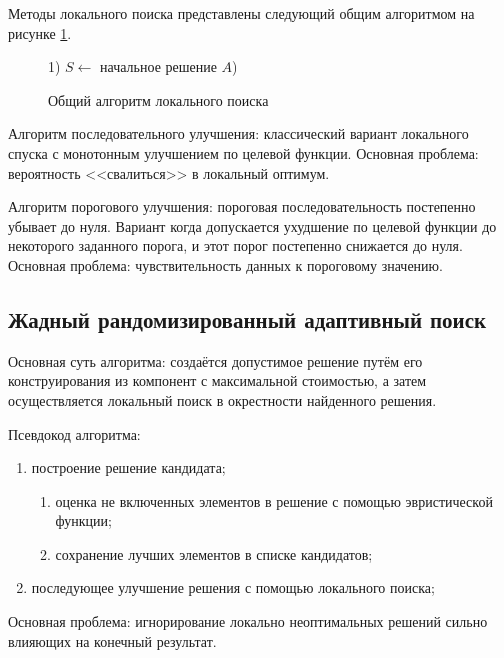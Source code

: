 Методы локального поиска представлены следующий общим алгоритмом на рисунке \ref{alg:local-search}.
\begin{figure}[ht!]
    \begin{algorithm}[H]
        1) \( S \leftarrow \) начальное решение \( A \)) 
    \end{algorithm}
    \vspace*{-1.5em}
    \caption{Общий алгоритм локального поиска}
    \label{alg:local-search}
\end{figure}

Алгоритм последовательного улучшения: классический вариант локального спуска с монотонным 
улучшением по целевой функции. Основная проблема: вероятность <<свалиться>> в локальный оптимум.

Алгоритм порогового улучшения: пороговая последовательность постепенно убывает до нуля. Вариант 
когда допускается ухудшение по целевой функции до некоторого заданного порога, и этот порог постепенно 
снижается до нуля. Основная проблема: чувствительность данных к пороговому значению.

\subsection{Жадный рандомизированный адаптивный поиск}
Основная суть алгоритма: создаётся допустимое решение путём его конструирования из компонент с 
максимальной стоимостью, а затем осуществляется локальный поиск в окрестности найденного решения.

Псевдокод алгоритма:
\begin{enumerate}
    \item построение решение кандидата;
    \begin{enumerate}
        \item оценка не включенных элементов в решение с помощью эвристической функции;
        \item сохранение лучших элементов в списке кандидатов;
    \end{enumerate}
    \item последующее улучшение решения с помощью локального поиска;
\end{enumerate}

Основная проблема: игнорирование локально неоптимальных решений сильно влияющих на конечный результат.

